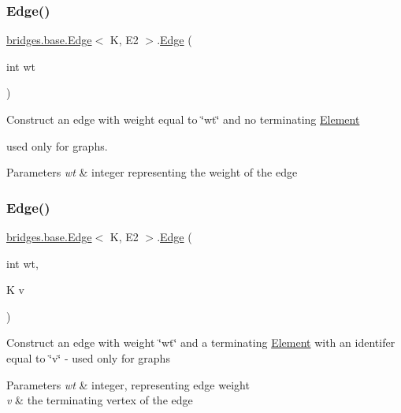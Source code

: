 \subsubsection{\texorpdfstring{Edge()}{Edge()}\hspace{0.1cm}{\footnotesize\ttfamily [2/4]}}
{\footnotesize\ttfamily \mbox{\hyperlink{classbridges_1_1base_1_1_edge}{bridges.\+base.\+Edge}}$<$ K, E2 $>$.\mbox{\hyperlink{classbridges_1_1base_1_1_edge}{Edge}} (\begin{DoxyParamCaption}\item[{int}]{wt }\end{DoxyParamCaption})}

Construct an edge with weight equal to \char`\"{}wt\char`\"{} and no terminating \mbox{\hyperlink{classbridges_1_1base_1_1_element}{Element}}
\begin{DoxyItemize}
\item used only for graphs. 
\begin{DoxyParams}{Parameters}
{\em wt} & integer representing the weight of the edge \\
\hline
\end{DoxyParams}

\end{DoxyItemize}\mbox{\label{classbridges_1_1base_1_1_edge_a545dc52ba877607102d36345cd80c583}} 
\subsubsection{\texorpdfstring{Edge()}{Edge()}\hspace{0.1cm}{\footnotesize\ttfamily [3/4]}}
{\footnotesize\ttfamily \mbox{\hyperlink{classbridges_1_1base_1_1_edge}{bridges.\+base.\+Edge}}$<$ K, E2 $>$.\mbox{\hyperlink{classbridges_1_1base_1_1_edge}{Edge}} (\begin{DoxyParamCaption}\item[{int}]{wt,  }\item[{K}]{v }\end{DoxyParamCaption})}

Construct an edge with weight \char`\"{}wt\char`\"{} and a terminating \mbox{\hyperlink{classbridges_1_1base_1_1_element}{Element}} with an identifer equal to \char`\"{}v\char`\"{} -\/ used only for graphs


\begin{DoxyParams}{Parameters}
{\em wt} & integer, representing edge weight \\
\hline
{\em v} & the terminating vertex of the edge \\
\hline
\end{DoxyParams}
\mbox{\label{classbridges_1_1base_1_1_edge_ae909816352bcc2260969c9cfcf802fae}} 
